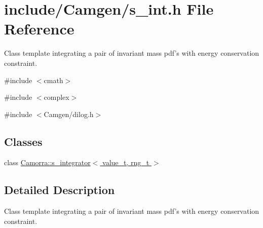 \hypertarget{a00596}{
\section{include/Camgen/s\_\-int.h File Reference}
\label{a00596}
}


Class template integrating a pair of invariant mass pdf's with energy conservation constraint.  


{\ttfamily \#include $<$cmath$>$}\par
{\ttfamily \#include $<$complex$>$}\par
{\ttfamily \#include $<$Camgen/dilog.h$>$}\par
\subsection*{Classes}
\begin{DoxyCompactItemize}
\item 
class \hyperlink{a00442}{Camorra::s\_\-integrator$<$ value\_\-t, rng\_\-t $>$}
\end{DoxyCompactItemize}


\subsection{Detailed Description}
Class template integrating a pair of invariant mass pdf's with energy conservation constraint. 